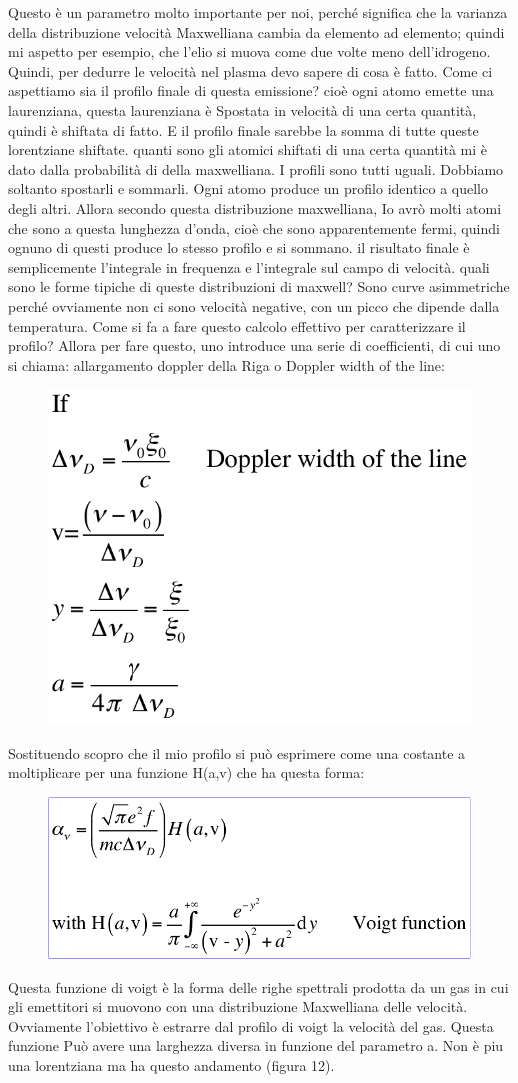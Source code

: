 \documentclass[a4paper,11pt]{article}
\begin{document}
Questo è un parametro molto importante per noi, perché significa che la varianza della distribuzione velocità Maxwelliana cambia da elemento ad elemento; quindi mi aspetto per esempio, che l’elio si muova come due volte meno dell'idrogeno.
Quindi, per dedurre le velocità nel plasma devo sapere di cosa è fatto. 
Come ci aspettiamo sia il profilo finale di questa emissione?
cioè ogni atomo emette una laurenziana, questa laurenziana è Spostata in velocità di una certa quantità, quindi è shiftata di fatto. E il profilo finale sarebbe la somma di tutte queste lorentziane shiftate.
quanti sono gli atomici shiftati di una certa quantità mi è dato dalla probabilità di della maxwelliana.
I profili sono tutti uguali. Dobbiamo soltanto spostarli e sommarli. Ogni atomo produce un profilo identico a quello degli altri. Allora secondo questa distribuzione maxwelliana, Io avrò molti atomi che sono a questa lunghezza d'onda, cioè che sono apparentemente fermi, quindi ognuno di questi produce lo stesso profilo e si sommano.
il risultato finale è semplicemente l'integrale in frequenza e l'integrale sul campo di velocità.
quali sono le forme tipiche di queste distribuzioni di maxwell? Sono curve asimmetriche perché ovviamente non ci sono velocità negative, con un picco che dipende dalla temperatura. 
Come si fa a fare questo calcolo effettivo per caratterizzare il profilo?
Allora per fare questo, uno introduce una serie di coefficienti, di cui uno si chiama: allargamento doppler della Riga o Doppler width of the line:
\\
\begin{figure}[h]
	\centering
	\includegraphics[width=0.4\linewidth]{dopplerwidthoftheline}
	\caption{}
	\label{fig:dopplerwidthoftheline}
\end{figure}

Sostituendo scopro che il mio profilo si può esprimere come una costante a moltiplicare per una funzione H(a,v) che ha questa forma:
\begin{figure}[h!!]
	\centering
	\includegraphics[width=0.4\linewidth]{voigtfunction}
	\caption{}
	\label{fig:voigtfunction}
\end{figure}
Questa funzione di voigt è la forma delle righe spettrali prodotta da un gas in cui gli emettitori si muovono con una distribuzione Maxwelliana delle velocità.
Ovviamente l'obiettivo è estrarre dal profilo di voigt la velocità del gas. 
Questa funzione Può avere una larghezza diversa in funzione del parametro a.
Non è piu una lorentziana ma ha questo andamento (figura 12).
\end{document}
